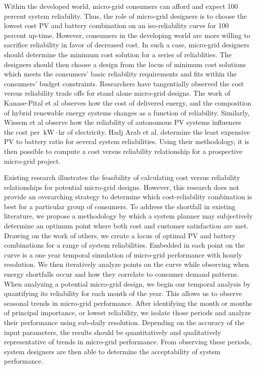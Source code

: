\documentclass[11p]{article}
\newcommand{\unit}[1]{\ensuremath{\, \mathrm{#1}}}
\begin{document}
Within the developed world, micro-grid consumers can afford and expect 100 percent system reliability.
Thus, the role of micro-grid designers is to choose the lowest cost PV and battery combination on an iso-reliability curve for 100 percent up-time.
However, consumers in the developing world are more willing to sacrifice reliability in favor of decreased cost.
In such a case, micro-grid designers should determine the minimum cost solution for a series of reliablities. 
The designers should then choose a design from the locus of minimum cost solutions which meets the consumers' basic reliability requirements and fits within the consumers' budget constraints. 
Researchers \cite{Hadj,Kanase,Wissem} have tangentially observed the cost versus reliability trade offs for stand alone micro-grid designs.  
The work of Kanase-Pital et al \cite{Kanase} observes how the cost of delivered energy, and the composition of hybrid renewable energy systems changes as a function of reliability.  
Similarly, Wissem et al \cite{Wissem} observe how the reliability of autonomous PV systems influences the cost per \unit{kW \! \cdot \! hr} of electricity. 
Hadj Arab et al. \cite{Hadj} determine the least expensive PV to battery ratio for several system reliabilities. 
Using their methodology, it is then possible to compute a cost versus reliability relationship for a prospective micro-grid project. 

Existing research illustrates the feasibility of calculating cost versus reliability relationships for potential micro-grid designs.
However, this research does not provide an overarching strategy to determine which cost-reliability combination is best for a particular group of consumers.  
To address the shortfall in existing literature, we propose a methodology by which a system planner may subjectively determine an optimum point where both cost and customer satisfaction are met.
Drawing on the work of others, we create a locus of optimal PV and battery combinations for a range of system reliabilities.
Embedded in each point on the curve is a one year temporal simulation of micro-grid performance with hourly resolution.  
We then iteratively analyze points on the curve while observing when energy shortfalls occur and how they correlate to consumer demand patterns.
When analyzing a potential micro-grid design, we begin our temporal analysis by quantifying its reliability for each month of the year. 
This allows us to observe seasonal trends in micro-grid performance. 
After identifying the month or months of principal importance, or lowest reliability, we isolate those periods and analyze their performance using sub-daily resolution. 
Depending on the accuracy of the input parameters, the results should be quantitatively and qualitatively representative of trends in micro-grid performance. 
From observing these periods, system designers are then able to determine the acceptability of system performance.
\end{document}

